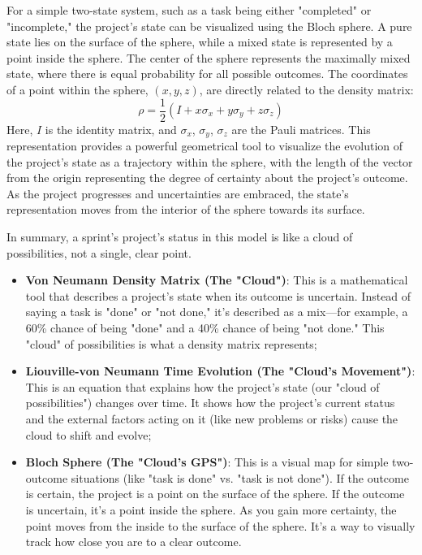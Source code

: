 \documentclass{article}
\begin{document}
For a simple two-state system, such as a task being either "completed" or "incomplete," the project's state can be visualized using the Bloch sphere. A pure state lies on the surface of the sphere, while a mixed state is represented by a point inside the sphere. The center of the sphere represents the maximally mixed state, where there is equal probability for all possible outcomes. The coordinates of a point within the sphere, $(x, y, z)$, are directly related to the density matrix:
$$
\rho = \frac{1}{2}(I + x\sigma_x + y\sigma_y + z\sigma_z)
$$
Here, $I$ is the identity matrix, and $\sigma_x$, $\sigma_y$, $\sigma_z$ are the Pauli matrices. This representation provides a powerful geometrical tool to visualize the evolution of the project's state as a trajectory within the sphere, with the length of the vector from the origin representing the degree of certainty about the project's outcome. As the project progresses and uncertainties are embraced, the state's representation moves from the interior of the sphere towards its surface.

In summary, a sprint's project's status in this model is like a cloud of possibilities, not a single, clear point.
\begin{itemize}
  \item \textbf{Von Neumann Density Matrix (The "Cloud")}: This is a mathematical tool that describes a project's state when its outcome is uncertain. Instead of saying a task is "done" or "not done," it's described as a mix—for example, a 60\% chance of being "done" and a 40\% chance of being "not done." This "cloud" of possibilities is what a density matrix represents;
  
  \item \textbf{Liouville-von Neumann Time Evolution (The "Cloud's Movement")}: This is an equation that explains how the project's state (our "cloud of possibilities") changes over time. It shows how the project's current status and the external factors acting on it (like new problems or risks) cause the cloud to shift and evolve;
  
  \item \textbf{Bloch Sphere (The "Cloud's GPS")}: This is a visual map for simple two-outcome situations (like "task is done" vs. "task is not done"). If the outcome is certain, the project is a point on the surface of the sphere. If the outcome is uncertain, it's a point inside the sphere. As you gain more certainty, the point moves from the inside to the surface of the sphere. It's a way to visually track how close you are to a clear outcome.
\end{itemize}
\end{document}
